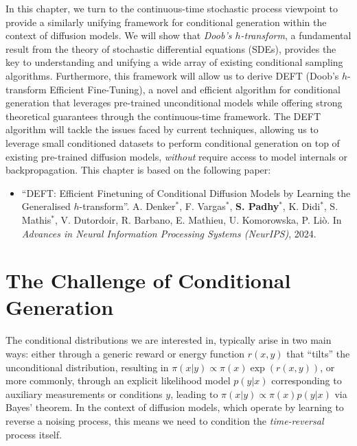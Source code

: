 In this chapter, we turn to the continuous-time stochastic process viewpoint to provide a similarly unifying framework for conditional generation within the context of diffusion models. We will show that \textit{Doob's $h$-transform}, a fundamental result from the theory of stochastic differential equations (SDEs), provides the key to understanding and unifying a wide array of existing conditional sampling algorithms. Furthermore, this framework will allow us to derive DEFT (Doob’s $h$-transform Efficient Fine-Tuning), a novel and efficient algorithm for conditional generation that leverages pre-trained unconditional models while offering strong theoretical guarantees through the continuous-time framework. The DEFT algorithm will tackle the issues faced by current techniques, allowing us to leverage small conditioned datasets to perform conditional generation on top of existing pre-trained diffusion models, \textit{without} require access to model internals or backpropagation. This chapter is based on the following paper:
\begin{itemize}
    \item ``DEFT: Efficient Finetuning of Conditional Diffusion Models by Learning the Generalised $ h $-transform''. A. Denker$^{*}$, F. Vargas$^{*}$, \textbf{S. Padhy}$^{*}$, K. Didi$^{*}$, S. Mathis$^{*}$, V. Dutordoir, R. Barbano, E. Mathieu, U. Komorowska, P. Liò. In \textit{Advances in Neural Information Processing Systems (NeurIPS)}, 2024.
\end{itemize}

\section{The Challenge of Conditional Generation}

The conditional distributions we are interested in, typically arise in two main ways: either through a generic reward or energy function $r(x,y)$ that ``tilts'' the unconditional distribution, resulting in $\pi(x|y) \propto \pi(x) \exp(r(x,y))$, or more commonly, through an explicit likelihood model $p(y|x)$ corresponding to auxiliary measurements or conditions $y$, leading to $\pi(x|y) \propto \pi(x) p(y|x)$ via Bayes' theorem. In the context of diffusion models, which operate by learning to reverse a noising process, this means we need to condition the \emph{time-reversal} process itself.


